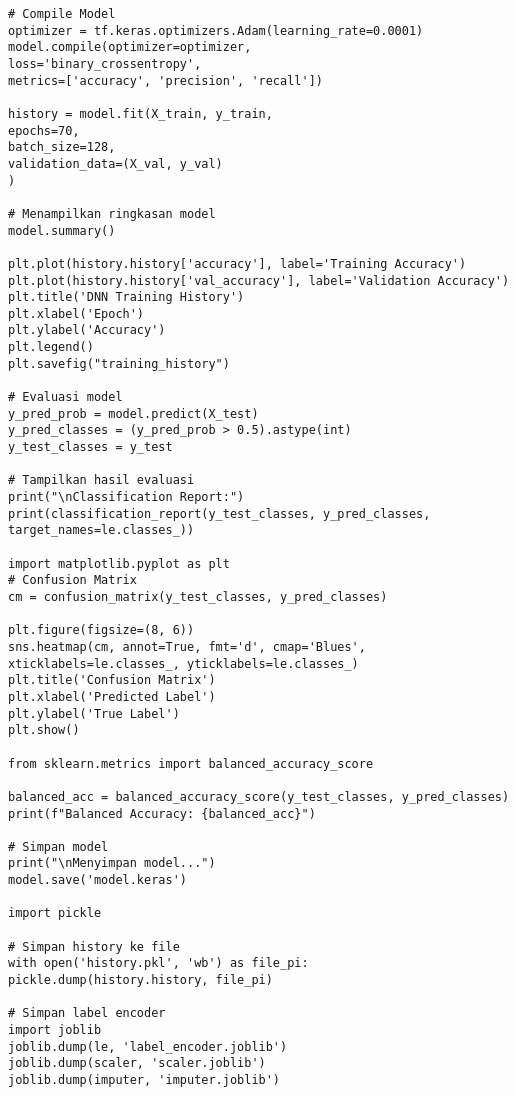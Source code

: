 \documentclass[a4paper,12pt]{report}
\begin{document}
\begin{lstlisting}
# Compile Model
optimizer = tf.keras.optimizers.Adam(learning_rate=0.0001)
model.compile(optimizer=optimizer,
loss='binary_crossentropy',
metrics=['accuracy', 'precision', 'recall'])

history = model.fit(X_train, y_train,
epochs=70,
batch_size=128,
validation_data=(X_val, y_val)
)

# Menampilkan ringkasan model
model.summary()

plt.plot(history.history['accuracy'], label='Training Accuracy')
plt.plot(history.history['val_accuracy'], label='Validation Accuracy')
plt.title('DNN Training History')
plt.xlabel('Epoch')
plt.ylabel('Accuracy')
plt.legend()
plt.savefig("training_history")

# Evaluasi model
y_pred_prob = model.predict(X_test)
y_pred_classes = (y_pred_prob > 0.5).astype(int)
y_test_classes = y_test

# Tampilkan hasil evaluasi
print("\nClassification Report:")
print(classification_report(y_test_classes, y_pred_classes, target_names=le.classes_))

import matplotlib.pyplot as plt
# Confusion Matrix
cm = confusion_matrix(y_test_classes, y_pred_classes)

plt.figure(figsize=(8, 6))
sns.heatmap(cm, annot=True, fmt='d', cmap='Blues', xticklabels=le.classes_, yticklabels=le.classes_)
plt.title('Confusion Matrix')
plt.xlabel('Predicted Label')
plt.ylabel('True Label')
plt.show()

from sklearn.metrics import balanced_accuracy_score

balanced_acc = balanced_accuracy_score(y_test_classes, y_pred_classes)
print(f"Balanced Accuracy: {balanced_acc}")

# Simpan model
print("\nMenyimpan model...")
model.save('model.keras')

import pickle

# Simpan history ke file
with open('history.pkl', 'wb') as file_pi:
pickle.dump(history.history, file_pi)

# Simpan label encoder
import joblib
joblib.dump(le, 'label_encoder.joblib')
joblib.dump(scaler, 'scaler.joblib')
joblib.dump(imputer, 'imputer.joblib')


	\end{lstlisting}
\newpage
\end{document}
